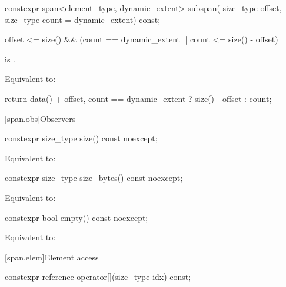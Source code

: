 %
\begin{itemdecl}
constexpr span<element_type, dynamic_extent> subspan(
  size_type offset, size_type count = dynamic_extent) const;
\end{itemdecl}

\begin{itemdescr}
\pnum
\hardexpects
\begin{codeblock}
offset <= size() && (count == dynamic_extent || count <= size() - offset)
\end{codeblock}
is .

\pnum
\effects
Equivalent to:
\begin{codeblock}
return {data() + offset, count == dynamic_extent ? size() - offset : count};
\end{codeblock}
\end{itemdescr}

[span.obs]{Observers}

%
\begin{itemdecl}
constexpr size_type size() const noexcept;
\end{itemdecl}

\begin{itemdescr}
\pnum
\effects
Equivalent to: 
\end{itemdescr}

%
\begin{itemdecl}
constexpr size_type size_bytes() const noexcept;
\end{itemdecl}

\begin{itemdescr}
\pnum
\effects
Equivalent to: 
\end{itemdescr}

%
\begin{itemdecl}
constexpr bool empty() const noexcept;
\end{itemdecl}

\begin{itemdescr}
\pnum
\effects
Equivalent to: 
\end{itemdescr}

[span.elem]{Element access}

%
\begin{itemdecl}
constexpr reference operator[](size_type idx) const;
\end{itemdecl}

